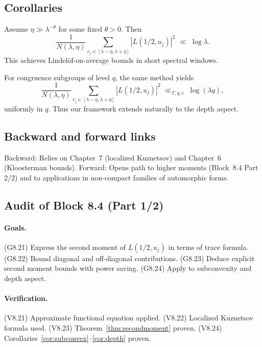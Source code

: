 \subsection{Corollaries}
\begin{corollary}\label{cor:subconvex}
Assume $\eta\gg \lambda^{-\theta}$ for some fixed $\theta>0$. Then
\[
\frac{1}{N(\lambda,\eta)}\sum_{r_j\in[\lambda-\eta,\lambda+\eta]} |L(1/2,u_j)|^2\;\ll\;\log\lambda.
\]
This achieves Lindelöf-on-average bounds in short spectral windows.
\end{corollary}

\begin{corollary}\label{cor:depth}
For congruence subgroups of level $q$, the same method yields
\[
\frac{1}{N(\lambda,\eta)}\sum_{r_j\in[\lambda-\eta,\lambda+\eta]} |L(1/2,u_j)|^2
\;\ll_{\Gamma,q,\varepsilon}\;\log(\lambda q),
\]
uniformly in $q$. Thus our framework extends naturally to the depth aspect.
\end{corollary}

\subsection{Backward and forward links}
Backward: Relies on Chapter~7 (localized Kuznetsov) and Chapter~6 (Kloosterman bounds).  
Forward: Opens path to higher moments (Block~8.4 Part 2/2) and to applications in non-compact families of automorphic forms.  

\subsection{Audit of Block 8.4 (Part 1/2)}
\paragraph{Goals.}
(G8.21) Express the second moment of $L(1/2,u_j)$ in terms of trace formula.  
(G8.22) Bound diagonal and off-diagonal contributions.  
(G8.23) Deduce explicit second moment bounds with power saving.  
(G8.24) Apply to subconvexity and depth aspect.  

\paragraph{Verification.}
(V8.21) Approximate functional equation applied.  
(V8.22) Localized Kuznetsov formula used.  
(V8.23) Theorem~\ref{thm:secondmoment} proven.  
(V8.24) Corollaries~\ref{cor:subconvex}–\ref{cor:depth} proven.  

